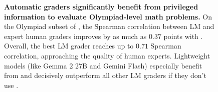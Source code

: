 \begin{figure}[t]
    \begin{center}
        \hfill
        \begin{minipage}[t]{0.75\textwidth}
            \caption{
                \small
                \textbf{\small Automatic graders significantly benefit from privileged information to evaluate Olympiad-level math problems.}
                On the Olympiad subset of \MathOdyssey, the Spearman correlation between LM and expert human graders improves by as much as $0.37$ points with \PI.
                Overall, the best LM grader reaches up to $0.71$ Spearman correlation, approaching the quality of human experts.
                Lightweight models (like Gemma 2 27B and Gemini Flash) especially benefit from \PI and decisively outperform all other LM graders if they don't use \PI.
            }
            \label{fig:odyssey_autoraters_eval}
        \end{minipage}
    \end{center}
    \vspace{-1em}
\end{figure}